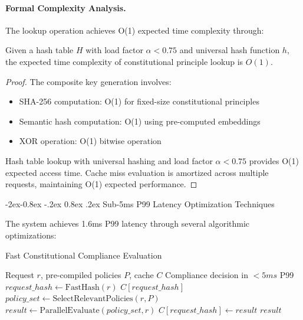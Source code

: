 \documentclass[manuscript,screen,9pt]{acmart}
\makeatletter
\renewcommand\subsubsection{\@startsection{subsubsection}{3}{\z@}%
  {-2ex\@plus -0.8ex \@minus -.2ex}%
  {0.8ex \@plus .2ex}%
  {\normalfont\normalsize\bfseries}}
\makeatother
\begin{document}
\paragraph{Formal Complexity Analysis.} The lookup operation achieves O(1) expected time complexity through:

\begin{theorem}
	Given a hash table $H$ with load factor $\alpha < 0.75$ and universal hash function $h$, the expected time complexity of constitutional principle lookup is $O(1)$.
\end{theorem}

\begin{proof}
	The composite key generation involves:
	\begin{itemize}
		\item SHA-256 computation: O(1) for fixed-size constitutional principles
		\item Semantic hash computation: O(1) using pre-computed embeddings
		\item XOR operation: O(1) bitwise operation
	\end{itemize}
	Hash table lookup with universal hashing and load factor $\alpha < 0.75$ provides O(1) expected access time. Cache miss evaluation is amortized across multiple requests, maintaining O(1) expected performance.
\end{proof}

\subsubsection{Sub-5ms P99 Latency Optimization Techniques}

The system achieves 1.6ms P99 latency through several algorithmic optimizations:

\begin{algorithm}[H]
	\caption{Fast Constitutional Compliance Evaluation}
	\label{alg:fast_compliance}
	\begin{algorithmic}[1]
		\Require Request $r$, pre-compiled policies $P$, cache $C$
		\Ensure Compliance decision in $< 5ms$ P99
		\State $request\_hash \leftarrow \text{FastHash}(r)$
		\State \Return $C[request\_hash]$ 
		\EndIf
		\State $policy\_set \leftarrow \text{SelectRelevantPolicies}(r, P)$
		\State $result \leftarrow \text{ParallelEvaluate}(policy\_set, r)$
		\State $C[request\_hash] \leftarrow result$
		\State \Return $result$
	\end{algorithmic}
\end{algorithm}
\end{document}
